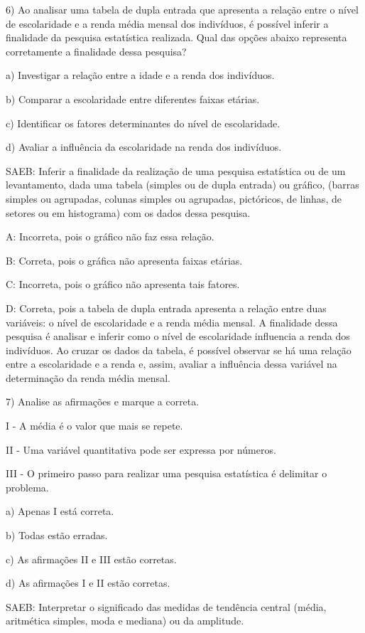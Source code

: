 6) Ao analisar uma tabela de dupla entrada que apresenta a relação entre
o nível de escolaridade e a renda média mensal dos indivíduos, é
possível inferir a finalidade da pesquisa estatística realizada. Qual
das opções abaixo representa corretamente a finalidade dessa pesquisa?

a) Investigar a relação entre a idade e a renda dos indivíduos.

b) Comparar a escolaridade entre diferentes faixas etárias.

c) Identificar os fatores determinantes do nível de escolaridade.

d) Avaliar a influência da escolaridade na renda dos indivíduos.

SAEB: Inferir a finalidade da realização de uma pesquisa estatística ou
de um levantamento, dada uma tabela (simples ou de dupla entrada) ou
gráfico, (barras simples ou agrupadas, colunas simples ou agrupadas,
pictóricos, de linhas, de setores ou em histograma) com os dados dessa
pesquisa.

A: Incorreta, pois o gráfico não faz essa relação.

B: Correta, pois o gráfica não apresenta faixas etárias.

C: Incorreta, pois o gráfico não apresenta tais fatores.

D: Correta, pois a tabela de dupla entrada apresenta a relação entre
duas variáveis: o nível de escolaridade e a renda média mensal. A
finalidade dessa pesquisa é analisar e inferir como o nível de
escolaridade influencia a renda dos indivíduos. Ao cruzar os dados da
tabela, é possível observar se há uma relação entre a escolaridade e a
renda e, assim, avaliar a influência dessa variável na determinação da
renda média mensal.

7) Analise as afirmações e marque a correta.

I - A média é o valor que mais se repete.

II - Uma variável quantitativa pode ser expressa por números.

III - O primeiro passo para realizar uma pesquisa estatística é
delimitar o problema.

a) Apenas I está correta.

b) Todas estão erradas.

c) As afirmações II e III estão corretas.

d) As afirmações I e II estão corretas.

SAEB: Interpretar o significado das medidas de tendência central (média,
aritmética simples, moda e mediana) ou da amplitude.

